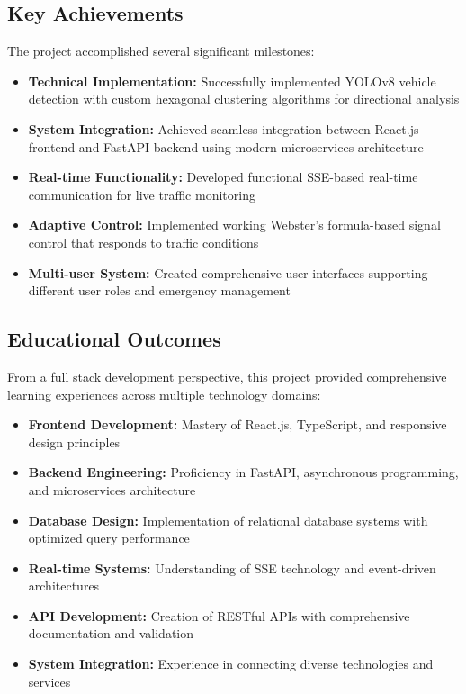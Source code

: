 \documentclass[conference]{IEEEtran}
\begin{document}
\subsection{Key Achievements}

The project accomplished several significant milestones:

\begin{itemize}
\item \textbf{Technical Implementation:} Successfully implemented YOLOv8 vehicle detection with custom hexagonal clustering algorithms for directional analysis
\item \textbf{System Integration:} Achieved seamless integration between React.js frontend and FastAPI backend using modern microservices architecture
\item \textbf{Real-time Functionality:} Developed functional SSE-based real-time communication for live traffic monitoring
\item \textbf{Adaptive Control:} Implemented working Webster's formula-based signal control that responds to traffic conditions
\item \textbf{Multi-user System:} Created comprehensive user interfaces supporting different user roles and emergency management
\end{itemize}

\subsection{Educational Outcomes}

From a full stack development perspective, this project provided comprehensive learning experiences across multiple technology domains:

\begin{itemize}
\item \textbf{Frontend Development:} Mastery of React.js, TypeScript, and responsive design principles
\item \textbf{Backend Engineering:} Proficiency in FastAPI, asynchronous programming, and microservices architecture
\item \textbf{Database Design:} Implementation of relational database systems with optimized query performance
\item \textbf{Real-time Systems:} Understanding of SSE technology and event-driven architectures
\item \textbf{API Development:} Creation of RESTful APIs with comprehensive documentation and validation
\item \textbf{System Integration:} Experience in connecting diverse technologies and services
\end{itemize}
\end{document}
